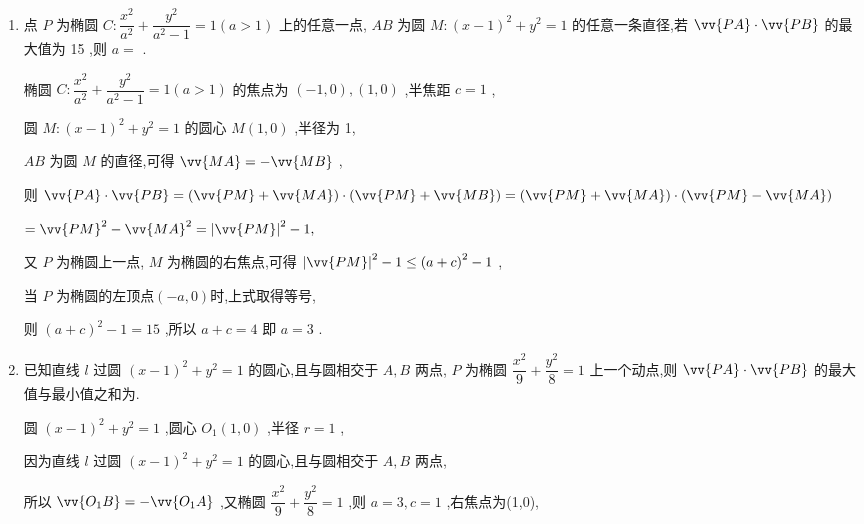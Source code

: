 \begin{enumerate}
\begin{jieda}
        $= {\left( \left| QN\right|  + \left| NO\right| \right) }^{2} - {c}^{2} = {\left( \dfrac{\left| P{F}_{1}\right| }{2} + \dfrac{\left| P{F}_{2}\right| }{2}\right) }^{2} - {c}^{2} = {a}^{2} - {c}^{2} = {b}^{2} = 3$
    \end{jieda}
    \item 点 $P$ 为椭圆 $C : \dfrac{{x}^{2}}{{a}^{2}} + \dfrac{{y}^{2}}{{a}^{2} - 1} = 1\left( {a > 1}\right)$ 上的任意一点, ${AB}$ 为圆 $M : {\left( x - 1\right) }^{2} + {y}^{2} = 1$ 的任意一条直径,若 $\vv{PA} \cdot  \vv{PB}$ 的最大值为 15 ,则 $a =$ .
    \begin{jieda}
        椭圆 $C : \dfrac{{x}^{2}}{{a}^{2}} + \dfrac{{y}^{2}}{{a}^{2} - 1} = 1\left( {a > 1}\right)$ 的焦点为 $\left( {-1,0}\right) ,\left( {1,0}\right)$ ,半焦距 $c = 1$ ,
        
        圆 $M : {\left( x - 1\right) }^{2} + {y}^{2} = 1$ 的圆心 $M\left( {1,0}\right)$ ,半径为 1,
        
        ${AB}$ 为圆 $M$ 的直径,可得 $\vv{MA} =  - \vv{MB}$ ,
        
        则 $\vv{PA} \cdot  \vv{PB} = \left( {\vv{PM} + \vv{MA}}\right)  \cdot  \left( {\vv{PM} + \vv{MB}}\right)  = \left( {\vv{PM} + \vv{MA}}\right)  \cdot  \left( {\vv{PM} - \vv{MA}}\right)$
        
        $= {\vv{PM}}^{2} - {\vv{MA}}^{2} = {\left| \vv{PM}\right| }^{2} - 1,$
        
        又 $P$ 为椭圆上一点, $M$ 为椭圆的右焦点,可得 ${\left| \vv{PM}\right| }^{2} - 1 \leq  {\left( a + c\right) }^{2} - 1$ ,
        
        当 $P$ 为椭圆的左顶点$(-a,0)$时,上式取得等号,
        
        则 ${\left( a + c\right) }^{2} - 1 = {15}$ ,所以 $a + c = 4$ 即 $a = 3$ .
    \end{jieda}
    \item 已知直线 $l$ 过圆 ${\left( x - 1\right) }^{2} + {y}^{2} = 1$ 的圆心,且与圆相交于 ${A},B$ 两点, $P$ 为椭圆 $\dfrac{{x}^{2}}{9} + \dfrac{{y}^{2}}{8} = 1$ 上一个动点,则 $\vv{PA} \cdot  \vv{PB}$ 的最大值与最小值之和为.
    \begin{jieda}
        圆 ${\left( x - 1\right) }^{2} + {y}^{2} = 1$ ,圆心 ${O}_{1}\left( {1,0}\right)$ ,半径 $r = 1$ ,
        
        因为直线 $l$ 过圆 ${\left( x - 1\right) }^{2} + {y}^{2} = 1$ 的圆心,且与圆相交于 ${A},B$ 两点,
        
        所以 $\vv{{O}_{1}B} =  - \vv{{O}_{1}A}$ ,又椭圆 $\dfrac{{x}^{2}}{9} + \dfrac{{y}^{2}}{8} = 1$ ,则 $a = 3,c = 1$ ,右焦点为(1,0),
        

\end{jieda}
\end{enumerate}
